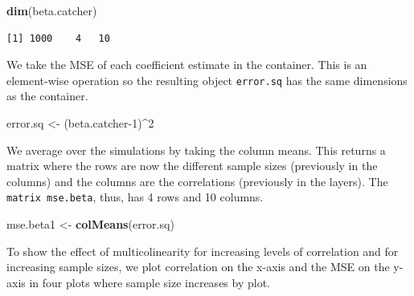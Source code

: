 \documentclass[]{article}
\newenvironment{Shaded}{\begin{snugshade}}{\end{snugshade}}
\newcommand{\DecValTok}[1]{\textcolor[rgb]{0.00,0.00,0.81}{#1}}
\newcommand{\KeywordTok}[1]{\textcolor[rgb]{0.13,0.29,0.53}{\textbf{#1}}}
\newcommand{\NormalTok}[1]{#1}
\newcommand{\OperatorTok}[1]{\textcolor[rgb]{0.81,0.36,0.00}{\textbf{#1}}}
\newcommand{\StringTok}[1]{\textcolor[rgb]{0.31,0.60,0.02}{#1}}
\begin{document}
\begin{Shaded}
\begin{Highlighting}[]
\KeywordTok{dim}\NormalTok{(beta.catcher)}
\end{Highlighting}
\end{Shaded}

\begin{verbatim}
[1] 1000    4   10
\end{verbatim}

We take the MSE of each coefficient estimate in the container. This is an element-wise operation so the resulting object \texttt{error.sq} has the same dimensions as the container.

\begin{Shaded}
\begin{Highlighting}[]
\NormalTok{error.sq <-}\StringTok{ }\NormalTok{(beta.catcher}\DecValTok{-1}\NormalTok{)}\OperatorTok{^}\DecValTok{2} 
\end{Highlighting}
\end{Shaded}

We average over the simulations by taking the column means. This returns a matrix where the rows are now the different sample sizes (previously in the columns) and the columns are the correlations (previously in the layers). The \texttt{matrix\ mse.beta}, thus, has 4 rows and 10 columns.

\begin{Shaded}
\begin{Highlighting}[]
\NormalTok{mse.beta1 <-}\StringTok{ }\KeywordTok{colMeans}\NormalTok{(error.sq) }
\end{Highlighting}
\end{Shaded}

To show the effect of multicolinearity for increasing levels of correlation and for increasing sample sizes, we plot correlation on the x-axis and the MSE on the y-axis in four plots where sample size increases by plot.
\end{document}
